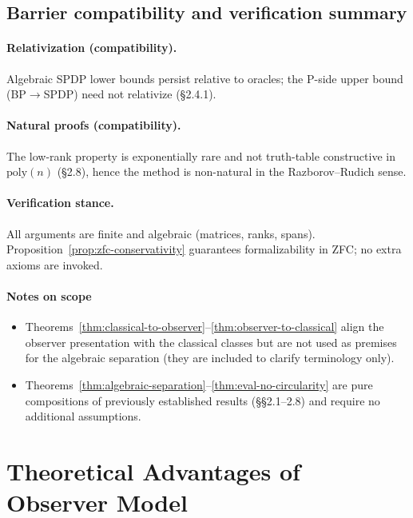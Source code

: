 \documentclass[12pt]{article}
\theoremstyle{definition}
\theoremstyle{definition}
\theoremstyle{remark}
\theoremstyle{remark}
\begin{document}
\subsection{Barrier compatibility and verification summary}

\paragraph{Relativization (compatibility).}
Algebraic SPDP lower bounds persist relative to oracles; the P-side upper bound (BP$\to$SPDP) need not relativize (\S2.4.1).

\paragraph{Natural proofs (compatibility).}
The low-rank property is exponentially rare and not truth-table constructive in $\mathrm{poly}(n)$ (\S2.8), hence the method is non-natural in the Razborov--Rudich sense.

\paragraph{Verification stance.}
All arguments are finite and algebraic (matrices, ranks, spans). Proposition~\ref{prop:zfc-conservativity} guarantees formalizability in ZFC; no extra axioms are invoked.

\paragraph{Notes on scope}
\begin{itemize}
\item Theorems~\ref{thm:classical-to-observer}--\ref{thm:observer-to-classical} align the observer presentation with the classical classes but are not used as premises for the algebraic separation (they are included to clarify terminology only).
\item Theorems~\ref{thm:algebraic-separation}--\ref{thm:eval-no-circularity} are pure compositions of previously established results (\S\S2.1--2.8) and require no additional assumptions.
\end{itemize}

\section{Theoretical Advantages of Observer Model}
\label{sec:theoretical-advantages}
\end{document}
